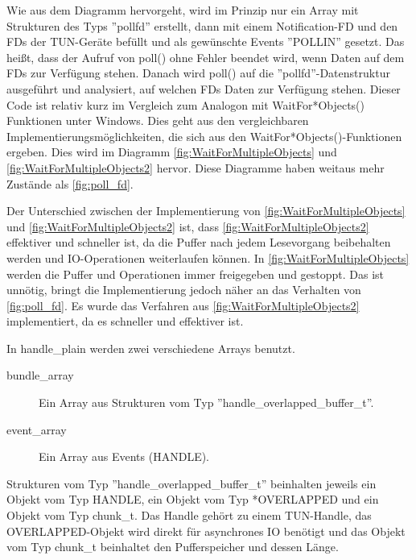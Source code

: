 {Wie aus dem Diagramm hervorgeht, wird im Prinzip nur ein Array mit Strukturen des Typs
''pollfd'' erstellt, dann mit einem Notification-\ac{FD} und den \acp{FD} der TUN-Geräte befüllt
und als gewünschte Events ''POLLIN'' gesetzt. Das heißt, dass der Aufruf von poll() ohne
Fehler beendet wird, wenn Daten auf dem \acp{FD} zur Verfügung stehen.
Danach wird poll() auf die ''pollfd''-Datenstruktur ausgeführt und analysiert,
auf welchen \acp{FD} Daten zur Verfügung stehen. Dieser Code ist relativ kurz im
Vergleich zum Analogon mit WaitFor*Objects() Funktionen unter Windows.
Dies geht aus den vergleichbaren Implementierungsmöglichkeiten, die sich aus den
WaitFor*Objects()-Funktionen ergeben. Dies wird im Diagramm \autoref{fig:WaitForMultipleObjects}
und \autoref{fig:WaitForMultipleObjects2} hervor. Diese Diagramme haben weitaus
mehr Zustände als \autoref{fig:poll_fd}.

Der Unterschied zwischen der Implementierung von \autoref{fig:WaitForMultipleObjects}
und \autoref{fig:WaitForMultipleObjects2} ist, dass \autoref{fig:WaitForMultipleObjects2}
effektiver und schneller ist, da die Puffer nach jedem Lesevorgang beibehalten werden
und IO-Operationen weiterlaufen können.
In \autoref{fig:WaitForMultipleObjects} werden die Puffer und Operationen
immer freigegeben und gestoppt. Das ist unnötig, bringt die Implementierung
jedoch näher an das Verhalten von \autoref{fig:poll_fd}.
Es wurde das Verfahren aus \autoref{fig:WaitForMultipleObjects2} implementiert,
da es schneller und effektiver ist.

In handle\_plain werden zwei verschiedene Arrays benutzt.
\begin{description}
\item[bundle\_array] Ein Array aus Strukturen vom Typ ''handle\_overlapped\_buffer\_t''. 
\item[event\_array] Ein Array aus Events (HANDLE).
\end{description}

Strukturen vom Typ ''handle\_overlapped\_buffer\_t'' beinhalten jeweils ein Objekt
vom Typ HANDLE, ein Objekt vom Typ *OVERLAPPED und ein Objekt vom Typ chunk\_t.
Das Handle gehört zu einem TUN-Handle, das OVERLAPPED-Objekt wird direkt für asynchrones
IO benötigt und das Objekt vom Typ chunk\_t beinhaltet den Pufferspeicher und dessen Länge.

}
